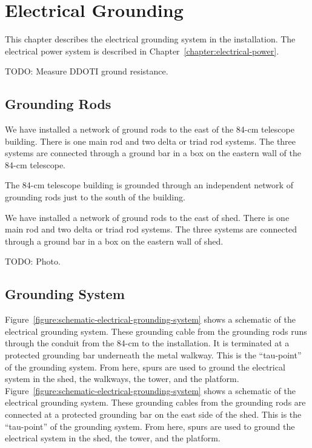 \chapter{Electrical Grounding}
\label{chapter:electrical-grounding}

This chapter describes the electrical grounding system in the {\projectname} installation. The electrical power system is described in Chapter~\ref{chapter:electrical-power}.

TODO: Measure DDOTI ground resistance.

\section{Grounding Rods}

\ifcoatlioan
We have installed a network of ground rods to the 
east of the 84-cm telescope building. There is one main rod and two delta or triad rod systems. The three systems are connected through a ground bar in a box on the eastern wall of the 84-cm telescope.

The 84-cm telescope building is grounded through an independent network of grounding rods just to the south of the building.
\fi

\ifddotioan
We have installed a network of ground rods to the 
east of shed. There is one main rod and two delta or triad rod systems. The three systems are connected through a ground bar in a box on the eastern wall of shed.
\fi

TODO: Photo.


\section{Grounding System}

\ifcoatlioan
Figure~\ref{figure:schematic-electrical-grounding-system} shows a schematic of the electrical grounding system. These grounding cable from the grounding rods runs through the conduit from the 84-cm to the {\projectname} installation. It is terminated at a protected grounding bar underneath the metal walkway. This is the “tau-point” of the grounding system. From here, spurs are used to ground the electrical system in the shed, the walkways, the tower, and the platform.
\fi
\ifddotioan
Figure~\ref{figure:schematic-electrical-grounding-system} shows a schematic of the electrical grounding system. These grounding cables from the grounding rods are connected at a protected grounding bar on the east side of the shed. This is the “tau-point” of the grounding system. From here, spurs are used to ground the electrical system in the shed, the tower, and the platform.
\fi

